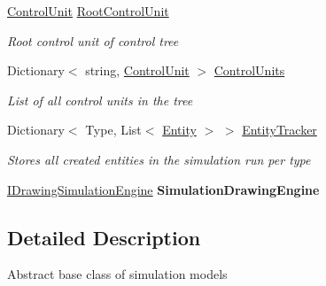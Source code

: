 \begin{DoxyCompactItemize}
\item 
\hyperlink{class_simulation_core_1_1_h_c_c_m_elements_1_1_control_unit}{Control\+Unit} \hyperlink{class_simulation_core_1_1_simulation_classes_1_1_simulation_model_adc6ff3791a65c144a03da32307e438e8}{Root\+Control\+Unit}
\begin{DoxyCompactList}\small\item\em Root control unit of control tree \end{DoxyCompactList}\item 
Dictionary$<$ string, \hyperlink{class_simulation_core_1_1_h_c_c_m_elements_1_1_control_unit}{Control\+Unit} $>$ \hyperlink{class_simulation_core_1_1_simulation_classes_1_1_simulation_model_aea904fcb233f91997093bb009eb48029}{Control\+Units}
\begin{DoxyCompactList}\small\item\em List of all control units in the tree \end{DoxyCompactList}\item 
Dictionary$<$ Type, List$<$ \hyperlink{class_simulation_core_1_1_h_c_c_m_elements_1_1_entity}{Entity} $>$ $>$ \hyperlink{class_simulation_core_1_1_simulation_classes_1_1_simulation_model_a0cde5d5c69bb03585275535f46990ee0}{Entity\+Tracker}
\begin{DoxyCompactList}\small\item\em Stores all created entities in the simulation run per type \end{DoxyCompactList}\item 
\hyperlink{interface_simulation_core_1_1_interfaces_1_1_i_drawing_simulation_engine}{I\+Drawing\+Simulation\+Engine} {\bfseries Simulation\+Drawing\+Engine}\hypertarget{class_simulation_core_1_1_simulation_classes_1_1_simulation_model_aa94ca8e5505f00f7de60c046ef579f75}{}\label{class_simulation_core_1_1_simulation_classes_1_1_simulation_model_aa94ca8e5505f00f7de60c046ef579f75}

\end{DoxyCompactItemize}


\subsection{Detailed Description}
Abstract base class of simulation models 



